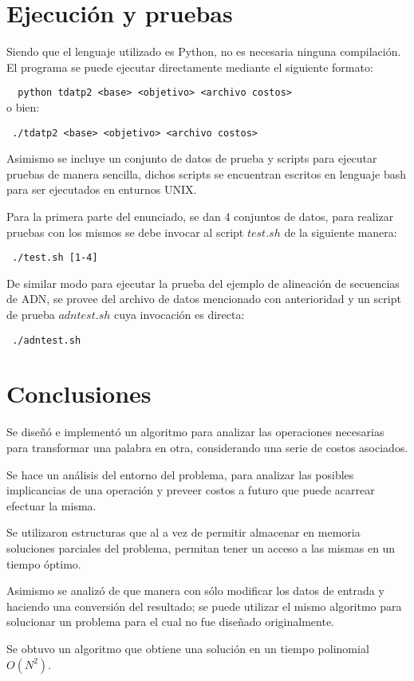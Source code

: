 \documentclass[12pt]{article}
\begin{document}
\newpage
\section{Ejecución y pruebas}
	Siendo que el lenguaje utilizado es Python, no es necesaria ninguna 
	compilación. El programa se puede ejecutar directamente mediante el 
	siguiente formato:
	
	\verb#  python tdatp2 <base> <objetivo> <archivo costos>#
	\\o bien: 
	
	\verb# ./tdatp2 <base> <objetivo> <archivo costos>#
	
	Asimismo se incluye un conjunto de datos de prueba y scripts para 
	ejecutar pruebas de manera sencilla, dichos scripts se encuentran 
	escritos en lenguaje bash para ser ejecutados en enturnos UNIX.
	
	Para la primera parte del enunciado, se dan 4 conjuntos de datos, 
	para realizar pruebas con los mismos se debe invocar al script $test.sh$ 
	de la siguiente manera:
	
	\verb# ./test.sh [1-4]#
	
	De similar modo para ejecutar la prueba del ejemplo de alineación de
	secuencias de ADN, se provee del archivo de datos mencionado con 
	anterioridad y un script de prueba $adntest.sh$ cuya invocación es directa:
	
	\verb# ./adntest.sh#
	
\newpage
\section{Conclusiones}
	Se diseñó e implementó un algoritmo para analizar las operaciones 
	necesarias para transformar una palabra en otra, considerando una
	serie de costos asociados.
	
	Se hace un análisis del entorno del problema, para analizar las 
	posibles implicancias de una operación y preveer costos a futuro
	que puede acarrear efectuar la misma.
	
	Se utilizaron estructuras que al a vez de permitir almacenar en 
	memoria soluciones parciales del problema, permitan tener un acceso
	a las mismas en un tiempo óptimo.
	
	Asimismo se analizó de que manera con sólo modificar los datos de 
	entrada y haciendo una conversión del resultado; se puede utilizar 
	el mismo algoritmo para solucionar un problema para el cual no fue
	diseñado originalmente.
	
	Se obtuvo un algoritmo que obtiene una solución en un tiempo polinomial $O(N^{2})$.
\end{document}
